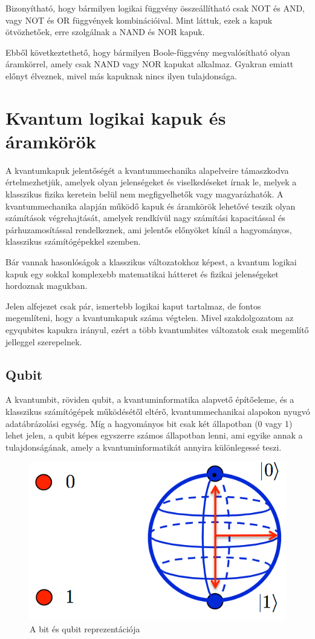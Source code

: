 \documentclass[
]{thesis-ekf}
\theoremstyle{definition}
\theoremstyle{remark}
\begin{document}
Bizonyítható, hogy bármilyen logikai függvény összeállítható csak NOT és AND, vagy NOT és OR függvények kombinációival. Mint láttuk, ezek a kapuk ötvözhetőek, erre szolgálnak a NAND és NOR kapuk.

Ebből következtethető, hogy bármilyen Boole-függvény megvalósítható olyan áramkörrel, amely csak NAND vagy NOR kapukat alkalmaz. Gyakran emiatt előnyt élveznek, mivel más kapuknak nincs ilyen tulajdonsága.

\section{Kvantum logikai kapuk és áramkörök}
A kvantumkapuk jelentőségét a kvantummechanika alapelveire támaszkodva értelmezhetjük, amelyek olyan jelenségeket és viselkedéseket írnak le, melyek a klasszikus fizika keretein belül nem megfigyelhetők vagy magyarázhatók. A kvantummechanika alapján működő kapuk és áramkörök lehetővé teszik olyan számítások végrehajtását, amelyek rendkívül nagy számítási kapacitással és párhuzamosítással rendelkeznek, ami jelentős előnyöket kínál a hagyományos, klasszikus számítógépekkel szemben.

Bár vannak hasonlóságok a klasszikus változatokhoz képest, a kvantum logikai kapuk egy sokkal komplexebb matematikai hátteret és fizikai jelenségeket hordoznak magukban.

Jelen alfejezet csak pár, ismertebb logikai kaput tartalmaz, de fontos megemlíteni, hogy a kvantumkapuk száma végtelen. Mivel szakdolgozatom az egyqubites kapukra irányul, ezért a több kvantumbites változatok csak megemlítő jelleggel szerepelnek.

\subsection{Qubit}
A kvantumbit, röviden qubit, a kvantuminformatika alapvető építőeleme, és a klasszikus számítógépek működésétől eltérő, kvantummechanikai alapokon nyugvó adatábrázolási egység. Míg a hagyományos bit csak két állapotban (0 vagy 1) lehet jelen, a qubit képes egyszerre számos állapotban lenni, ami egyike annak a tulajdonságának, amely a kvantuminformatikát annyira különlegessé teszi.

\begin{figure}[H]
	\centering
	\includegraphics[width=0.3\linewidth]{bitQubit}
	\caption{A bit és qubit reprezentációja}
	\label{fig:bitqubit}
\end{figure}
\end{document}
